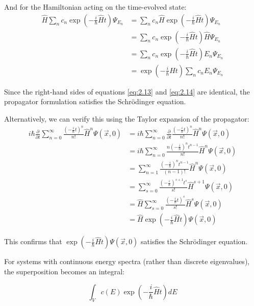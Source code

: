 \documentclass[italian]{HKNdocument}
\begin{document}
And for the Hamiltonian acting on the time-evolved state:
\begin{align}
\hat{H}\sum_n c_n\exp\left(-\frac{i}{\hbar}\hat{H}t\right)\Psi_{E_n} &= \sum_n c_n\hat{H}\exp\left(-\frac{i}{\hbar}\hat{H}t\right)\Psi_{E_n} \\
&= \sum_n c_n\exp\left(-\frac{i}{\hbar}\hat{H}t\right)\hat{H}\Psi_{E_n} \\
&= \sum_n c_n\exp\left(-\frac{i}{\hbar}\hat{H}t\right)E_n\Psi_{E_n} \label{eq:2.14} \\
&= \exp\left(-\frac{i}{\hbar}\hat{H}t\right)\sum_n c_nE_n\Psi_{E_n}
\end{align}

Since the right-hand sides of equations \eqref{eq:2.13} and \eqref{eq:2.14} are identical, the propagator formulation satisfies the Schrödinger equation.

Alternatively, we can verify this using the Taylor expansion of the propagator:
\begin{align}
i\hbar\frac{\partial}{\partial t}\sum_{n=0}^{\infty}\frac{\left(-\frac{i}{\hbar}t\right)^n}{n!}\hat{H}^n\Psi(\vec{x},0) &= i\hbar\sum_{n=0}^{\infty}\frac{\partial}{\partial t}\frac{\left(-\frac{i}{\hbar}t\right)^n}{n!}\hat{H}^n\Psi(\vec{x},0) \\
&= i\hbar\sum_{n=0}^{\infty}\frac{n\left(-\frac{i}{\hbar}\right)^nt^{n-1}}{n!}\hat{H}^n\Psi(\vec{x},0) \\
&= \sum_{n=1}^{\infty}\frac{\left(-\frac{i}{\hbar}\right)^nt^{n-1}}{(n-1)!}\hat{H}^n\Psi(\vec{x},0) \label{eq:2.15} \\
&= \sum_{s=0}^{\infty}\frac{\left(-\frac{i}{\hbar}\right)^{s+1}t^s}{s!}\hat{H}^{s+1}\Psi(\vec{x},0) \\
&= \hat{H}\sum_{s=0}^{\infty}\frac{\left(-\frac{i}{\hbar}t\right)^s}{s!}\hat{H}^s\Psi(\vec{x},0) \\
&= \hat{H}\exp\left(-\frac{i}{\hbar}\hat{H}t\right)\Psi(\vec{x},0)
\end{align}

This confirms that $\exp\left(-\frac{i}{\hbar}\hat{H}t\right)\Psi(\vec{x},0)$ satisfies the Schrödinger equation.

For systems with continuous energy spectra (rather than discrete eigenvalues), the superposition becomes an integral:

\begin{equation}
\int_V c(E)\exp\left(-\frac{i}{\hbar}\hat{H}t\right)dE \label{eq:2.16}
\end{equation}
\end{document}
